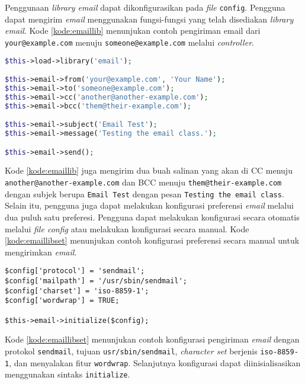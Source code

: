 Penggunaan \textit{library email} dapat dikonfigurasikan pada \textit{file} \texttt{config}. Pengguna dapat mengirim \textit{email} menggunakan fungsi-fungsi yang telah disediakan \textit{library email}. Kode \ref{kode:emaillib} menunjukan contoh pengiriman email dari \texttt{your@example.com} menuju \texttt{someone@example.com} melalui \textit{controller}.

\begin{lstlisting}[language=PHP, caption=Contoh pengiriman email melalui \textit{controller}, label=kode:emaillib]
$this->load->library('email');

$this->email->from('your@example.com', 'Your Name');
$this->email->to('someone@example.com');
$this->email->cc('another@another-example.com');
$this->email->bcc('them@their-example.com');

$this->email->subject('Email Test');
$this->email->message('Testing the email class.');

$this->email->send();
\end{lstlisting}

Kode \ref{kode:emaillib} juga mengirim dua buah salinan yang akan di CC menuju \texttt{another@another-example.com} dan BCC menuju \texttt{them@their-example.com} dengan subjek berupa \texttt{Email Test} dengan pesan \texttt{Testing the email class}. Selain itu, pengguna juga dapat melakukan konfigurasi preferensi \textit{email} melalui dua puluh satu preferesi. Pengguna dapat melakukan konfigurasi secara otomatis melalui \textit{file config} atau melakukan konfigurasi secara manual. Kode \ref{kode:emaillibset} menunjukan contoh konfigurasi preferensi secara manual untuk mengirimkan \textit{email}.

\begin{lstlisting}[caption=Contoh konfigurasi preferensi \textit{library email} secara manual, label=kode:emaillibset]
$config['protocol'] = 'sendmail';
$config['mailpath'] = '/usr/sbin/sendmail';
$config['charset'] = 'iso-8859-1';
$config['wordwrap'] = TRUE;

$this->email->initialize($config);
\end{lstlisting}
Kode \ref{kode:emaillibset} menunjukan contoh konfigurasi pengiriman \textit{email} dengan protokol \texttt{sendmail}, tujuan \texttt{usr/sbin/sendmail}, \textit{character set} berjenis \texttt{iso-8859-1}, dan menyalakan fitur \texttt{wordwrap}. Selanjutnya konfigurasi dapat diinisialisasikan menggunakan sintaks \texttt{initialize}.

